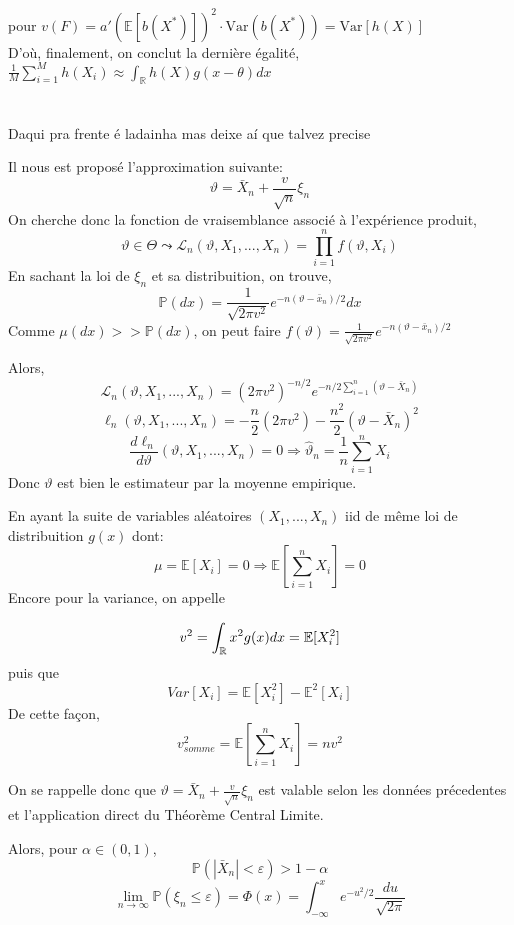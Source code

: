 \documentclass{article}
\newcommand{\mean}{\mathbb{E}}
\newcommand{\var}{\mathrm{Var}}
\newcommand{\R}{\mathbb{R}}
\begin{document}
pour $\displaystyle v(F)=a'(\mean[b(X^{*})])^2\cdot\var(b(X^{*}))=\var[h(X)]$
\vspace{0.5cm} \\
D'où, finalement, on conclut la dernière égalité,
\\ $\displaystyle \frac{1}{M}\sum_{i=1}^{M}h(X_{i}) \approx \int_{\mathbb{R}} h(X)g(x-\theta)dx$
\vspace{1 cm}
\\
\\
\\ {\Huge Daqui pra frente é ladainha mas deixe aí que talvez precise}


Il nous est proposé l'approximation suivante:
$$\vartheta=\bar X_n + \frac{v}{\sqrt{n}}\xi_n$$
On cherche donc la fonction de vraisemblance associé à l'expérience produit,
$$\vartheta \in \Theta \leadsto \mathcal{L}_n(\vartheta,X_1,...,X_n )= \prod_{i=1}^nf(\vartheta,X_i) $$
En sachant la loi de $\displaystyle \xi_n$ et sa distribuition, on trouve,
$$\mathbb{P}(dx)=\frac{1}{\sqrt{2\pi v^2}}e^{-n(\vartheta-\bar x_n)/2}dx$$
Comme $\displaystyle \mu(dx)>> \mathbb{P}(dx)$, on peut faire $\displaystyle f(\vartheta)=\frac{1}{\sqrt{2\pi v^2}}e^{-n(\vartheta-\bar x_n)/2}$

Alors,
$$\mathcal{L}_n(\vartheta,X_1,...,X_n )=(2\pi v^2)^{-n/2}e^{-n/2\sum_{i=1}^n(\vartheta - \bar X_ n)}$$
$$\ell_n(\vartheta,X_1,...,X_n )=-\frac{n}{2}(2\pi v^2)-\frac{n^2}{2}(\vartheta-\bar X_n)^2$$
$$\frac{d\ell_n}{d\vartheta}(\vartheta,X_1,...,X_n )=0 \Rightarrow\hat \vartheta_n=\frac{1}{n}\sum_{i=1}^nX_i$$
Donc $\displaystyle \vartheta$ est bien le estimateur par la moyenne empirique.



En ayant la suite de variables aléatoires $\displaystyle (X_1,...,X_n) $ iid de même loi de distribuition $\displaystyle g(x)$ dont:
$$\mu = \mean[X_i] = 0 \Rightarrow \mean[\sum_{i=1}^n X_i ] = 0 $$
Encore pour la variance, on appelle

$$\displaystyle v^2 = \int_{\cal \R} x^2g(x)dx = \mean[X_i^2]$$
puis que
$$\displaystyle Var[X_i] = \mean[X_i^2]-\mean^2[X_i] $$
De cette façon,
$$v_{somme}^2=\mean[\sum_{i=1}^n X_i ]= nv^2$$


On se rappelle donc que $\displaystyle\vartheta = \bar X_n + \frac{v}{\sqrt{n}}\xi_n$ est valable selon les données précedentes et l'application direct du Théorème Central Limite.

Alors, pour $\displaystyle \alpha\in(0,1)$,
$$\mathbb{P}(|\bar X_n |<\varepsilon)>1-\alpha$$
$$\lim_{n \to \infty}\mathbb{P}(\xi_n \leq \varepsilon)=\Phi(x) = \int_{-\infty}^xe^{-u^2/2}\frac{du}{\sqrt{2\pi}}$$
\end{document}
